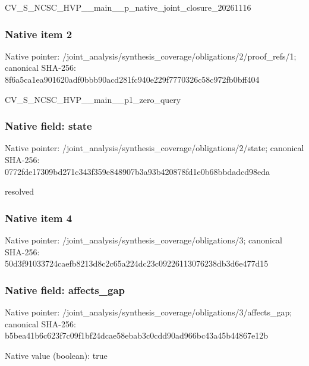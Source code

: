 \documentclass[10pt,a4paper]{article}
\begin{document}
\begingroup\raggedright\sloppy CV\_\allowbreak{}S\_\allowbreak{}NCSC\_\allowbreak{}HVP\_\allowbreak{}\_\allowbreak{}main\_\allowbreak{}\_\allowbreak{}p\_\allowbreak{}native\_\allowbreak{}joint\_\allowbreak{}closure\_\allowbreak{}20261116\par\endgroup

\subsubsection{Native item 2}
Native pointer: /joint\_\allowbreak{}analysis/synthesis\_\allowbreak{}coverage/obligations/2/proof\_\allowbreak{}refs/1; canonical SHA-256: 8f6a5ca1ea901620adf0bbb90acd281fc940e229f7770326c58c972fb0bff404

\begingroup\raggedright\sloppy CV\_\allowbreak{}S\_\allowbreak{}NCSC\_\allowbreak{}HVP\_\allowbreak{}\_\allowbreak{}main\_\allowbreak{}\_\allowbreak{}p1\_\allowbreak{}zero\_\allowbreak{}query\par\endgroup

\subsubsection{Native field: state}
Native pointer: /joint\_\allowbreak{}analysis/synthesis\_\allowbreak{}coverage/obligations/2/state; canonical SHA-256: 0772fde17309bd271c343f359e848907b3a93b420878fd1e0b68bbdadcd98eda

\begingroup\raggedright\sloppy resolved\par\endgroup

\subsubsection{Native item 4}
Native pointer: /joint\_\allowbreak{}analysis/synthesis\_\allowbreak{}coverage/obligations/3; canonical SHA-256: 50d3f91033724caefb8213d8c2c65a224dc23c09226113076238db3d6e477d15

\subsubsection{Native field: affects\_\allowbreak{}gap}
Native pointer: /joint\_\allowbreak{}analysis/synthesis\_\allowbreak{}coverage/obligations/3/affects\_\allowbreak{}gap; canonical SHA-256: b5bea41b6c623f7c09f1bf24dcae58ebab3c0cdd90ad966bc43a45b44867e12b

Native value (boolean): true
\end{document}
